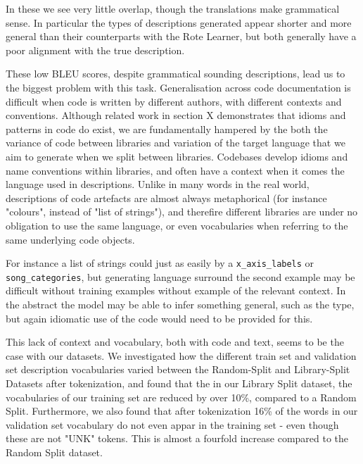 In these we see very little overlap, though the translations make grammatical sense. 
In particular the types of descriptions generated appear shorter and more general than their counterparts with the Rote Learner, but both generally have a poor alignment with the true description.


These low BLEU scores, despite grammatical sounding descriptions, lead us to the biggest problem with this task.
Generalisation across code documentation is difficult when code is written by different authors, with different contexts and conventions. 
Although related work in section X demonstrates that idioms and patterns in code do exist, we are fundamentally hampered by the both the variance of code between libraries and variation of the target language that we aim to generate when we split between libraries.
Codebases develop idioms and name conventions within libraries, and often have a context when it comes the language used in descriptions. 
Unlike in many words in the real world, descriptions of code artefacts are almost always metaphorical (for instance "colours", instead of "list of strings"),  and therefire different libraries are under no obligation to use the same language, or even vocabularies when referring to the same underlying code objects. 

For instance a list of strings could just as easily by a \texttt{x_axis_labels} or \texttt{song_categories}, but generating language surround the second example may be difficult without training examples without example of the relevant context.
 In the abstract the model may be able to infer something general, such as the type, but again idiomatic use of the code would need to be provided for this.

This lack of context and vocabulary, both with code and text, seems to be the case with our datasets.
We investigated how the different train set and validation set description vocabularies varied between the Random-Split and Library-Split Datasets after tokenization, and found that the in our Library Split dataset, the vocabularies of our training set are reduced by over 10\%, compared to a Random Split. 
Furthermore, we also found that after tokenization 16\% of the words in our validation set vocabulary do not even appar in the training set - even though these are not "UNK" tokens. This is almost a fourfold increase compared to the Random Split dataset.

